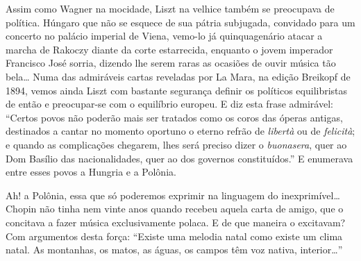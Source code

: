 Assim como Wagner na mocidade, Liszt na velhice também se preocupava de
política. Húngaro que não se esquece de sua pátria subjugada, convidado
para um concerto no palácio imperial de Viena, vemo-lo já quinquagenário
atacar a marcha de Rakoczy diante da corte estarrecida, enquanto o jovem
imperador Francisco José sorria, dizendo lhe serem raras as ocasiões de
ouvir música tão bela\ldots{} Numa das admiráveis cartas reveladas por La
Mara, na edição Breikopf de 1894, vemos ainda Liszt com bastante
segurança definir os políticos equilibristas de então e preocupar-se com
o equilíbrio europeu. E diz esta frase admirável: ``Certos povos não
poderão mais ser tratados como os coros das óperas antigas, destinados a
cantar no momento oportuno o eterno refrão de \textit{libertà} ou de \textit{felicità}; e
quando as complicações chegarem, lhes será preciso dizer o \textit{buonasera},
quer ao Dom Basílio das nacionalidades, quer ao dos governos
constituídos.'' E enumerava entre esses povos a Hungria e a Polônia.

Ah! a Polônia, essa que só poderemos exprimir na linguagem do
inexprimível\ldots{} Chopin não tinha nem vinte anos quando recebeu aquela
carta de amigo, que o concitava a fazer música exclusivamente polaca. E
de que maneira o excitavam? Com argumentos desta força: ``Existe uma
melodia natal como existe um clima natal. As montanhas, os matos, as
águas, os campos têm voz nativa, interior\ldots{}''

